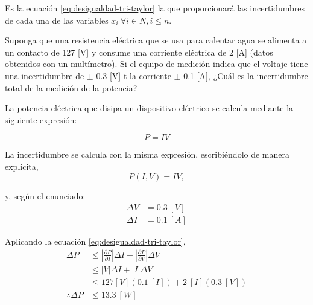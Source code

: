 Es la ecuación \ref{eq:desigualdad-tri-taylor} la que proporcionará las
incertidumbres de cada una de las variables $x_i\ \forall i \in N, i \leq n$.

\begin{ex}

    Suponga que una resistencia eléctrica que se usa para calentar agua se
    alimenta a un contacto de 127 [V] y consume una corriente eléctrica de
    2 [A] (datos obtenidos con un multímetro). Si el equipo de medición
    indica que el voltaje tiene una incertidumbre de $\pm$ 0.3 [V] t la
    corriente $\pm$ 0.1 [A], ¿Cuál es la incertidumbre total de la medición de
    la potencia?

    \begin{solution}
        La potencia eléctrica que disipa un dispositivo eléctrico se
        calcula mediante la siguiente expresión:

        \begin{equation*}
            P = IV
        \end{equation*}

        La incertidumbre se calcula con la misma expresión,
        escribiéndolo de manera explícita,
        \[
            P(I, V) = IV,
        \]

        \noindent y, según el enunciado:
        \begin{align*}
            \Delta V &= 0.3\ [\si{V}] \\
            \Delta I &= 0.1\ [\si{A}]
        \end{align*}

        Aplicando la ecuación \ref{eq:desigualdad-tri-taylor},
        \begin{align*}
            \Delta P &\leq
            \left| \frac{\partial P}{\partial I} \right| \Delta I +
            \left| \frac{\partial P}{\partial V} \right| \Delta V \\
                     &\leq \left| V \right| \Delta I + \left| I\right|
                     \Delta V \\
                     &\leq 127 [\si{V}](0.1\ [\si{I}]) + 2\ [\si{I}](0.3\ [\si{V}]) \\
            \therefore \Delta P &\leq 13.3\ [\si{W}]
        \end{align*}
    \end{solution}
\end{ex}


